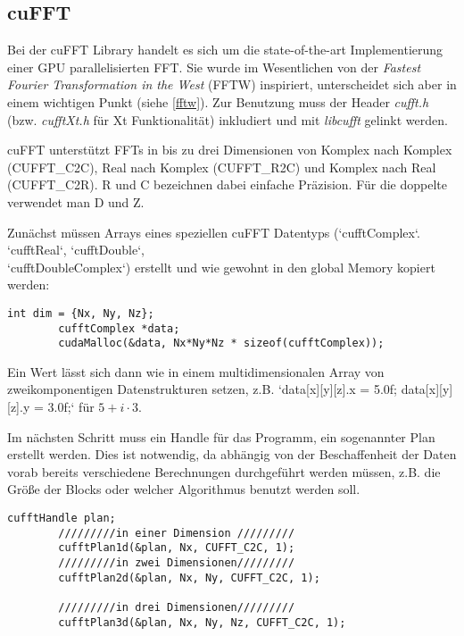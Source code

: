 
	\subsection{cuFFT}
    
		Bei der cuFFT Library handelt es sich um die state-of-the-art Implementierung einer GPU parallelisierten FFT. Sie wurde im Wesentlichen von der \textit{Fastest Fourier Transformation in the West} (FFTW) inspiriert, unterscheidet sich aber in einem wichtigen Punkt (siehe \ref{fftw}). Zur Benutzung muss der Header \textit{cufft.h} (bzw. \textit{cufftXt.h} für Xt Funktionalität) inkludiert und mit \textit{libcufft} gelinkt werden.
		
		cuFFT unterstützt FFTs in bis zu drei Dimensionen von Komplex nach Komplex (CUFFT{\_}C2C), Real nach Komplex (CUFFT{\_}R2C) und Komplex nach Real (CUFFT{\_}C2R). R und C bezeichnen dabei einfache Präzision. Für die doppelte verwendet man D und Z.
	
		Zunächst müssen Arrays eines speziellen cuFFT Datentyps (\li`cufftComplex`. \li`cufftReal`, \li`cufftDouble`,\\
		\li`cufftDoubleComplex`) erstellt und wie gewohnt in den \gls{global Memory} kopiert werden:
		
		\begin{lstlisting}[caption=cuFFT: komplexer Datentyp]
		int dim = {Nx, Ny, Nz};
		cufftComplex *data;
		cudaMalloc(&data, Nx*Ny*Nz * sizeof(cufftComplex));
		\end{lstlisting}
		
		Ein Wert lässt sich dann wie in einem multidimensionalen Array von zweikomponentigen Datenstrukturen setzen, z.B. \li`data[x][y][z].x = 5.0f; data[x][y][z].y = 3.0f;` für $5 + i\cdot 3$.
	
		Im nächsten Schritt muss ein \Gls{Handle} für das Programm, ein sogenannter Plan erstellt werden. Dies ist notwendig, da abhängig von der Beschaffenheit der Daten vorab bereits verschiedene Berechnungen durchgeführt werden müssen, z.B. die Größe der \Glspl{Block} oder welcher Algorithmus benutzt werden soll. 
		
		\begin{lstlisting}[caption=cuFFT: Pläne]
		cufftHandle plan;
		/////////in einer Dimension /////////
		cufftPlan1d(&plan, Nx, CUFFT_C2C, 1);	
		/////////in zwei Dimensionen/////////
		cufftPlan2d(&plan, Nx, Ny, CUFFT_C2C, 1);	
						
		/////////in drei Dimensionen/////////
		cufftPlan3d(&plan, Nx, Ny, Nz, CUFFT_C2C, 1);
		\end{lstlisting}
		
